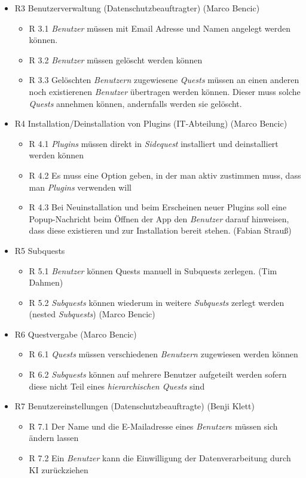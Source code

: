 \documentclass{article}
\begin{document}
\begin{itemize}
\item R3 Benutzerverwaltung (Datenschutzbeauftragter) (Marco Bencic)
    \begin{itemize}
        \item R 3.1 \textit{Benutzer} müssen mit Email Adresse und Namen angelegt werden können.
        \item R 3.2 \textit{Benutzer} müssen gelöscht werden können
        \item R 3.3 Gelöschten \textit{Benutzern} zugewiesene \textit{Quests} müssen an einen anderen noch existierenen \textit{Benutzer} übertragen werden können. Dieser muss solche \textit{Quests} annehmen können, andernfalls werden sie gelöscht. 
    \end{itemize}
\item R4 Installation/Deinstallation von Plugins (IT-Abteilung) (Marco Bencic)
    \begin{itemize}
        \item R 4.1 \textit{Plugins} müssen direkt in \textit{Sidequest} installiert und deinstalliert werden können 
        \item R 4.2 Es muss eine Option geben, in der man aktiv zustimmen muss, dass man \textit{Plugins} verwenden will
        \item R 4.3 Bei Neuinstallation und beim Erscheinen neuer Plugins soll eine Popup-Nachricht beim Öffnen der App den \textit{Benutzer} darauf hinweisen, dass diese existieren und zur Installation bereit stehen. (Fabian Strauß)
    \end{itemize}

\item R5 Subquests
    \begin{itemize}
        \item R 5.1 \textit{Benutzer} können Quests manuell in Subquests zerlegen. (Tim Dahmen) 
        \item R 5.2 \textit{Subquests} können wiederum in weitere \textit{Subquests} zerlegt werden (nested \textit{Subquests}) (Marco Bencic)
    \end{itemize}
\item R6 Questvergabe (Marco Bencic)
    \begin{itemize}
        \item R 6.1 \textit{Quests} müssen verschiedenen \textit{Benutzern} zugewiesen werden können
        \item R 6.2 \textit{Subquests} können auf mehrere Benutzer aufgeteilt werden sofern diese nicht Teil eines \textit{hierarchischen Quests} sind
    \end{itemize}
\item R7 Benutzereinstellungen (Datenschutzbeauftragte) (Benji Klett)
    \begin{itemize}
        \item R 7.1 Der Name und die E-Mailadresse eines \textit{Benutzer}s müssen sich ändern lassen
        \item R 7.2 Ein \textit{Benutzer} kann die Einwilligung der Datenverarbeitung durch KI zurückziehen
    \end{itemize}


\end{itemize}
\end{document}
